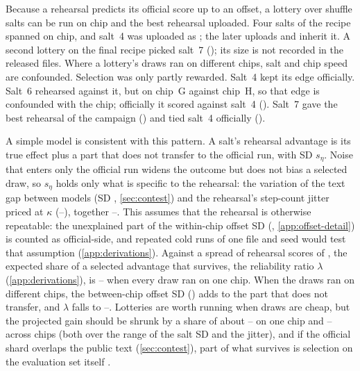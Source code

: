 Because a rehearsal predicts its official score up to an offset, a lottery over shuffle salts can be run on chip
and the best rehearsal uploaded.
Four salts of the  recipe spanned \docnum{} on chip, and salt~4 was uploaded as ;
the later uploads  and  inherit it. A second lottery on the final recipe picked salt~7
(); its size is not recorded in the released files. Where a lottery's draws ran on different chips, salt
and chip speed are confounded. Selection was only partly rewarded. Salt~4 kept its edge officially. Salt~6
rehearsed  against it, but on chip~G against chip~H, so that edge is confounded with the chip;
officially it scored  against salt~4 (). Salt~7 gave the best rehearsal of the campaign
() and tied salt~4 officially ().

A simple model is consistent with this pattern. A salt's rehearsal advantage is its true effect plus a part that
does not transfer to the official run, with SD $s_\eta$. Noise that enters only the official run widens the outcome
but does not bias a selected draw, so $s_\eta$ holds only what is specific to the rehearsal: the variation of the
text gap between models (SD , \cref{sec:contest}) and the rehearsal's step-count jitter priced at
$\kappa$ (--), together --. This assumes that the
rehearsal is otherwise repeatable: the unexplained part of the within-chip offset SD (,
\cref{app:offset-detail}) is counted as official-side, and repeated cold runs of one file and seed would test that
assumption (\cref{app:derivations}). Against a spread of
rehearsal scores of \docnum{}, the expected share of a selected advantage that survives, the reliability
ratio $\lambda$ (\cref{app:derivations}), is -- when every draw ran on one chip. When
the draws ran on different chips, the between-chip offset SD () adds to the part that does not
transfer, and $\lambda$ falls to --. Lotteries are worth running when draws
are cheap, but the projected gain should be shrunk by a share of about --
on one chip and -- across chips (both over the range of the salt SD
and the jitter),
and if the official shard overlaps the public text (\cref{sec:contest}), part of what survives is selection on the
evaluation set itself \citep{dwork2015reusable,blum2015ladder}.

